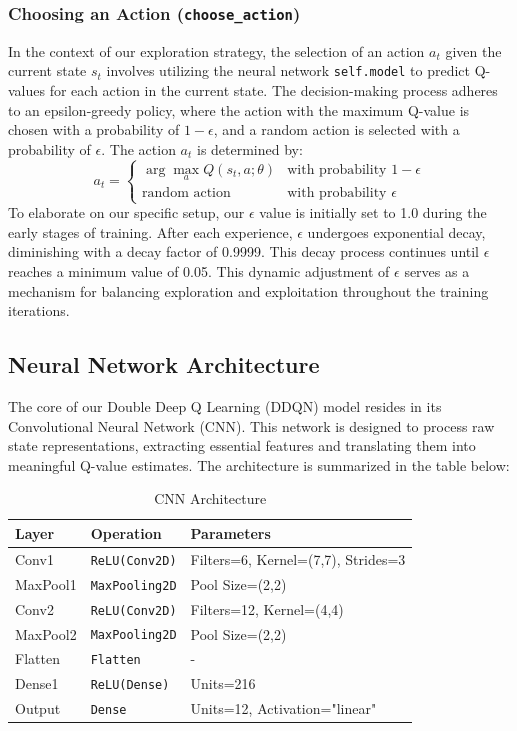 \documentclass{article}
\begin{document}
\subsubsection{Choosing an Action (\texttt{choose\_action})}

In the context of our exploration strategy, the selection of an action \(a_t\) given the current state \(s_t\) involves utilizing the neural network \texttt{self.model} to predict Q-values for each action in the current state. The decision-making process adheres to an epsilon-greedy policy, where the action with the maximum Q-value is chosen with a probability of \(1 - \epsilon\), and a random action is selected with a probability of \(\epsilon\).
The action \(a_t\) is determined by:
\[
a_t = 
\begin{cases} 
\arg \max_{a} Q(s_t, a; \theta) & \text{with probability } 1 - \epsilon \\
\text{random action} & \text{with probability } \epsilon
\end{cases}
\]
To elaborate on our specific setup, our \(\epsilon\) value is initially set to 1.0 during the early stages of training. After each experience, \(\epsilon\) undergoes exponential decay, diminishing with a decay factor of 0.9999. This decay process continues until \(\epsilon\) reaches a minimum value of 0.05. This dynamic adjustment of \(\epsilon\) serves as a mechanism for balancing exploration and exploitation throughout the training iterations.

\subsection{Neural Network Architecture}

The core of our Double Deep Q Learning (DDQN) model resides in its Convolutional Neural Network (CNN). This network is designed to process raw state representations, extracting essential features and translating them into meaningful Q-value estimates. The architecture is summarized in the table below:

\renewcommand{\arraystretch}{1.5} %
\begin{table}[ht!]
  \centering
  \caption{CNN Architecture}
  \begin{tabular}{|l|l|l|}
    \hline
    Layer & Operation & Parameters \\
    \hline
    Conv1 & \texttt{ReLU(Conv2D)} & Filters=6, Kernel=(7,7), Strides=3 \\
    MaxPool1 &\texttt{MaxPooling2D} & Pool Size=(2,2) \\
    Conv2 & \texttt{ReLU(Conv2D)} & Filters=12, Kernel=(4,4)  \\
    MaxPool2 & \texttt{MaxPooling2D} & Pool Size=(2,2)  \\
    Flatten &\texttt{Flatten} & -  \\
    Dense1 & \texttt{ReLU(Dense)} & Units=216  \\
    Output &\texttt{Dense }& Units=12, Activation="linear" \\
    \hline
  \end{tabular}
\end{table}
\end{document}
